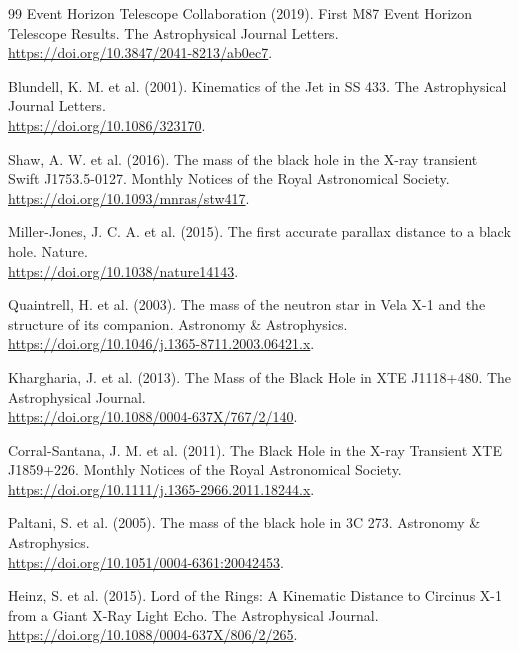 \documentclass[11pt, a4paper]{article}
\begin{document}
\begin{thebibliography}{99}
  Event Horizon Telescope Collaboration (2019). First M87 Event Horizon Telescope Results. The Astrophysical Journal Letters. \\ \url{https://doi.org/10.3847/2041-8213/ab0ec7}.

  Blundell, K. M. et al. (2001). Kinematics of the Jet in SS 433. The Astrophysical Journal Letters. \\ \url{https://doi.org/10.1086/323170}.

  Shaw, A. W. et al. (2016). The mass of the black hole in the X-ray transient Swift J1753.5-0127. Monthly Notices of the Royal Astronomical Society. \\ \url{https://doi.org/10.1093/mnras/stw417}.

  Miller-Jones, J. C. A. et al. (2015). The first accurate parallax distance to a black hole. Nature. \\ \url{https://doi.org/10.1038/nature14143}.

  Quaintrell, H. et al. (2003). The mass of the neutron star in Vela X-1 and the structure of its companion. Astronomy \& Astrophysics. \\ \url{https://doi.org/10.1046/j.1365-8711.2003.06421.x}.

  Khargharia, J. et al. (2013). The Mass of the Black Hole in XTE J1118+480. The Astrophysical Journal. \\ \url{https://doi.org/10.1088/0004-637X/767/2/140}.

  Corral-Santana, J. M. et al. (2011). The Black Hole in the X-ray Transient XTE J1859+226. Monthly Notices of the Royal Astronomical Society. \\ \url{https://doi.org/10.1111/j.1365-2966.2011.18244.x}.

  Paltani, S. et al. (2005). The mass of the black hole in 3C 273. Astronomy \& Astrophysics. \\ \url{https://doi.org/10.1051/0004-6361:20042453}.

  Heinz, S. et al. (2015). Lord of the Rings: A Kinematic Distance to Circinus X-1 from a Giant X-Ray Light Echo. The Astrophysical Journal. \\ \url{https://doi.org/10.1088/0004-637X/806/2/265}.


\end{thebibliography}
\end{document}
